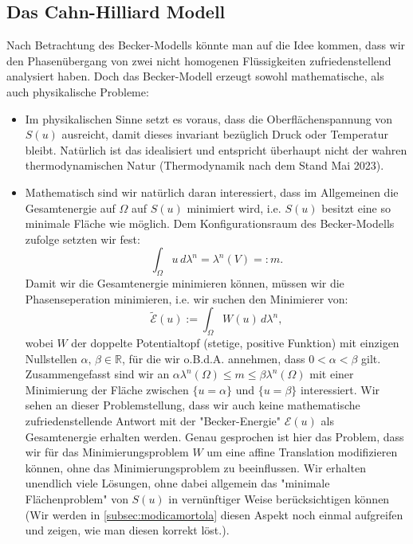 \subsection{Das Cahn-Hilliard Modell}{\label{subsec:cahnhilliard}}
Nach Betrachtung des Becker-Modells könnte man auf die Idee kommen, dass wir den Phasenübergang von zwei nicht homogenen Flüssigkeiten zufriedenstellend analysiert haben. Doch das Becker-Modell erzeugt sowohl mathematische, als auch physikalische Probleme:
\begin{itemize}
    \item Im physikalischen Sinne setzt es voraus, dass die Oberflächenspannung von \(S(u)\) ausreicht, damit dieses invariant bezüglich Druck oder Temperatur bleibt. Natürlich ist das idealisiert und entspricht überhaupt nicht der wahren thermodynamischen Natur (Thermodynamik nach dem Stand Mai 2023).
    \item Mathematisch sind wir natürlich daran interessiert, dass im Allgemeinen die Gesamtenergie auf \(\Omega\) auf \(S(u)\) minimiert wird, i.e. \(S(u)\) besitzt eine so minimale Fläche wie möglich. Dem Konfigurationsraum des Becker-Modells zufolge setzten wir fest:
    \begin{equation}
        \int_{\Omega} u \,d\lambda^n = \lambda^n(V) =: m.
    \end{equation}
    Damit wir die Gesamtenergie minimieren können, müssen wir die Phasenseperation minimieren, i.e. wir suchen den Minimierer von:
    \begin{equation}
        \tilde{\mathcal{E}}(u) := \int_{\Omega} W(u) \,d\lambda^n,
    \end{equation}
    wobei \(W\) der doppelte Potentialtopf (stetige, positive Funktion) mit einzigen Nullstellen \(\alpha, \, \beta \in \mathbb{R}\), für die wir o.B.d.A. annehmen, dass \(0 < \alpha < \beta\) gilt. Zusammengefasst sind wir an \(\alpha \lambda^n(\Omega) \leq m \leq \beta \lambda^n(\Omega)\) mit einer Minimierung der Fläche zwischen \(\{u = \alpha\}\) und \(\{u = \beta\}\) interessiert. Wir sehen an dieser Problemstellung, dass wir auch keine mathematische zufriedenstellende Antwort mit der "Becker-Energie" \(\mathcal{E}(u)\) als Gesamtenergie erhalten werden. Genau gesprochen ist hier das Problem, dass wir für das Minimierungsproblem \(W\) um eine affine Translation modifizieren können, ohne das Minimierungsproblem zu beeinflussen. Wir erhalten unendlich viele Lösungen, ohne dabei allgemein das "minimale Flächenproblem" von \(S(u)\) in vernünftiger Weise berücksichtigen können (Wir werden in \ref{subsec:modicamortola} diesen Aspekt noch einmal aufgreifen und zeigen, wie man diesen korrekt löst.).
\end{itemize} 
